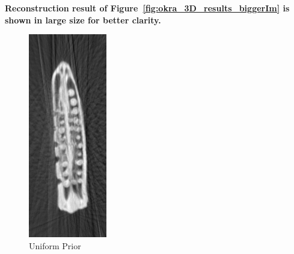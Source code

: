 \documentclass{article}
\begin{document}
\textbf{Reconstruction result of Figure~\ref{fig:okra_3D_results_biggerIm}  is shown in large size for better clarity.}
\begin{figure}[!h]
\centering
       \includegraphics[width=0.5\columnwidth]{../images/okra/pca_cropped.png}
\captionsetup{labelformat=empty}
        \caption{\large{Uniform Prior}}
\end{figure}
\newpage
\end{document}
